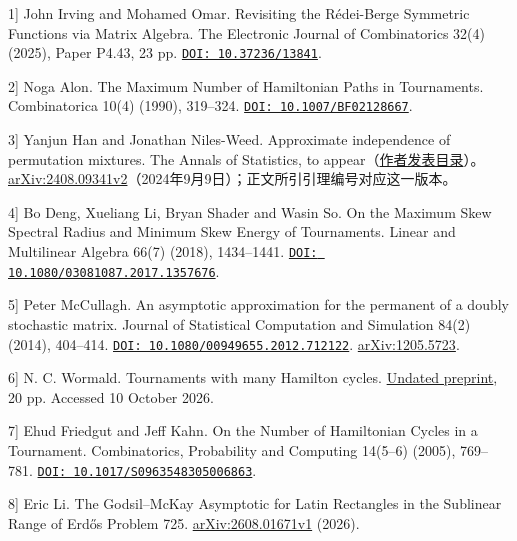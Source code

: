 \documentclass[11pt,a4paper]{article}
\begin{document}
\hypertarget{bib-1}{}\label{bib-1}\noindent {[}1{]} John Irving and Mohamed Omar. Revisiting the Rédei-Berge Symmetric Functions via Matrix Algebra. The Electronic Journal of Combinatorics 32(4) (2025), Paper P4.43, 23 pp. \href{https://doi.org/10.37236/13841}{\nolinkurl{DOI: 10.37236/13841}}.

\hypertarget{bib-2}{}\label{bib-2}\noindent {[}2{]} Noga Alon. The Maximum Number of Hamiltonian Paths in Tournaments. Combinatorica 10(4) (1990), 319--324. \href{https://doi.org/10.1007/BF02128667}{\nolinkurl{DOI: 10.1007/BF02128667}}.

\hypertarget{bib-3}{}\label{bib-3}\noindent {[}3{]} Yanjun Han and Jonathan Niles-Weed. Approximate independence of permutation mixtures. The Annals of Statistics, to appear（\href{https://yanjunhan2021.github.io/publication.html}{作者发表目录}）。\href{https://arxiv.org/html/2408.09341v2}{arXiv:2408.09341v2}（2024年9月9日）；正文所引引理编号对应这一版本。

\hypertarget{bib-4}{}\label{bib-4}\noindent {[}4{]} Bo Deng, Xueliang Li, Bryan Shader and Wasin So. On the Maximum Skew Spectral Radius and Minimum Skew Energy of Tournaments. Linear and Multilinear Algebra 66(7) (2018), 1434--1441. \href{https://doi.org/10.1080/03081087.2017.1357676}{\nolinkurl{DOI: 10.1080/03081087.2017.1357676}}.

\hypertarget{bib-5}{}\label{bib-5}\noindent {[}5{]} Peter McCullagh. An asymptotic approximation for the permanent of a doubly stochastic matrix. Journal of Statistical Computation and Simulation 84(2) (2014), 404--414. \href{https://doi.org/10.1080/00949655.2012.712122}{\nolinkurl{DOI: 10.1080/00949655.2012.712122}}. \href{https://arxiv.org/abs/1205.5723}{arXiv:1205.5723}.

\hypertarget{bib-6}{}\label{bib-6}\noindent {[}6{]} N. C. Wormald. Tournaments with many Hamilton cycles. \href{https://users.monash.edu.au/~nwormald/papers/hamtourn.pdf}{Undated preprint}, 20 pp. Accessed 10 October 2026.

\hypertarget{bib-7}{}\label{bib-7}\noindent {[}7{]} Ehud Friedgut and Jeff Kahn. On the Number of Hamiltonian Cycles in a Tournament. Combinatorics, Probability and Computing 14(5--6) (2005), 769--781. \href{https://doi.org/10.1017/S0963548305006863}{\nolinkurl{DOI: 10.1017/S0963548305006863}}.

\hypertarget{bib-8}{}\label{bib-8}\noindent {[}8{]} Eric Li. The Godsil--McKay Asymptotic for Latin Rectangles in the Sublinear Range of Erdős Problem 725. \href{https://arxiv.org/html/2608.01671v1}{arXiv:2608.01671v1} (2026).
\end{document}
